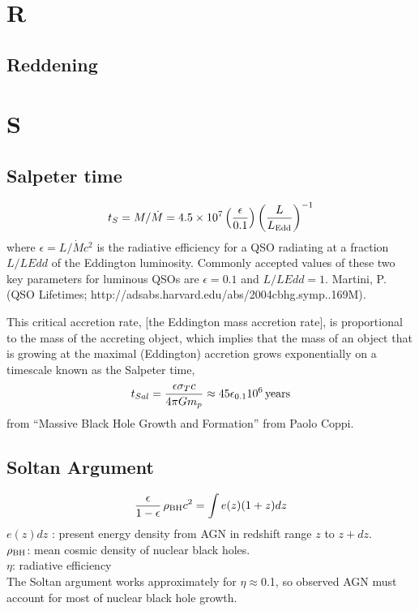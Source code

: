 \documentclass[11pt]{article}
\begin{document}
\section{R}
\subsection{Reddening}

\section{S}
\subsection{Salpeter time}
\begin{equation}
  t_{S} = M/\dot{M} = 4.5 \times10^{7} \left( \frac{\epsilon}{0.1}\right ) \left( \frac{L}{L_{\rm Edd}}\right )^{-1}
\end{equation}
where $\epsilon = L/\dot{M} c^{2}$ is the radiative efficiency for a QSO radiating at a fraction $L/LEdd$ of the Eddington luminosity. Commonly accepted values of these two key parameters for luminous QSOs are $\epsilon= 0.1$ and $L/LEdd = 1$. 
Martini, P. (QSO Lifetimes; http://adsabs.harvard.edu/abs/2004cbhg.symp..169M). 

This critical accretion rate, [the Eddington mass accretion rate], is proportional to the mass of the accreting object, which implies that the mass of an object that is growing at the maximal (Eddington) accretion grows exponentially on a timescale known as the Salpeter time,
\begin{equation}
  t_{Sal} = \frac{\epsilon \sigma_{T} c}{4\pi G m_{p}} \approx 45 \epsilon_{0.1} 10^6 \, {\rm years}
\end{equation}
from ``Massive Black Hole Growth and Formation'' from Paolo Coppi. 


\subsection{Soltan Argument}
\begin{equation}
  \frac{\epsilon}{1-\epsilon} \, \rho_{\rm BH} c^{2} = \int e(z) (1+z) dz
\end{equation}
$e(z) dz$ : present energy density from AGN in redshift range $z$ to $z+dz$.\\
$\rho_{\rm BH}$: mean cosmic density of nuclear black holes.\\
$\eta$: radiative efficiency\\
The Soltan argument works approximately for $\eta\approx$0.1, 
so observed AGN must account for most of nuclear black hole growth.
\end{document}
